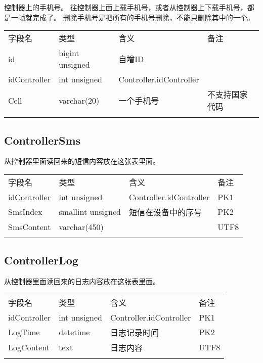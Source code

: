 控制器上的手机号。
往控制器上面上载手机号，或者从控制器上下载手机号，都是一帧就完成了。
删除手机号是把所有的手机号删除，不能只删除其中的一个。

\begin{longtabu}[c]{@{}lXXX@{}}
\toprule\addlinespace
字段名 & 类型 & 含义 & 备注
\\\addlinespace
\midrule\endhead
id & bigint unsigned & 自增ID &
\\\addlinespace
idController & int unsigned & Controller.idController &
\\\addlinespace
Cell & varchar(20) & 一个手机号 & 不支持国家代码
\\\addlinespace
\bottomrule
\end{longtabu}

\subsection{ControllerSms}\label{controllersms}

从控制器里面读回来的短信内容放在这张表里面。

\begin{longtabu}[c]{@{}lXXX@{}}
\toprule\addlinespace
字段名 & 类型 & 含义 & 备注
\\\addlinespace
\midrule\endhead
idController & int unsigned & Controller.idController & PK1
\\\addlinespace
SmsIndex & smallint unsigned & 短信在设备中的序号 & PK2
\\\addlinespace
SmsContent & varchar(450) & & UTF8
\\\addlinespace
\bottomrule
\end{longtabu}

\subsection{ControllerLog}\label{controllerlog}

从控制器里面读回来的日志内容放在这张表里面。

\begin{longtabu}[c]{@{}lXXX@{}}
\toprule\addlinespace
字段名 & 类型 & 含义 & 备注
\\\addlinespace
\midrule\endhead
idController & int unsigned & Controller.idController & PK1
\\\addlinespace
LogTime & datetime & 日志记录时间 & PK2
\\\addlinespace
LogContent & text & 日志内容 & UTF8
\\\addlinespace
\bottomrule
\end{longtabu}

